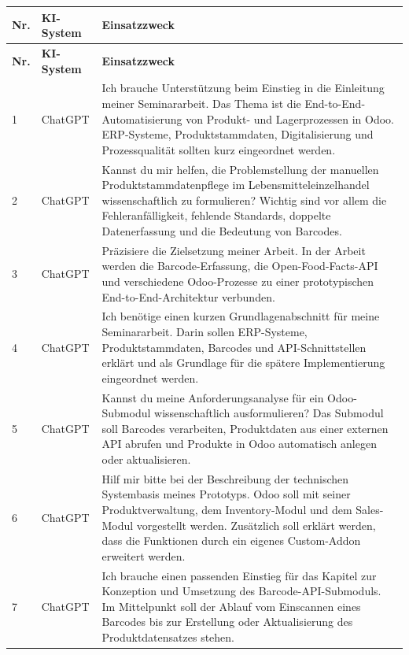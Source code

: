 \documentclass[12pt,a4paper]{article}
\begin{document}
\begin{longtable}{
    @{}
    p{0.9cm}
    p{3.2cm}
    >{\RaggedRight\arraybackslash}
    p{\dimexpr\textwidth-5.0cm\relax}
    @{}
}
\toprule
\textbf{Nr.} & \textbf{KI-System} & \textbf{Einsatzzweck} \\
\midrule
\endfirsthead

\toprule
\textbf{Nr.} & \textbf{KI-System} & \textbf{Einsatzzweck} \\
\midrule
\endhead

1 & ChatGPT & Ich brauche Unterstützung beim Einstieg in die Einleitung meiner Seminararbeit. Das Thema ist die End-to-End-Automatisierung von Produkt- und Lagerprozessen in Odoo. ERP-Systeme, Produktstammdaten, Digitalisierung und Prozessqualität sollten kurz eingeordnet werden. \\

2 & ChatGPT & Kannst du mir helfen, die Problemstellung der manuellen Produktstammdatenpflege im Lebensmitteleinzelhandel wissenschaftlich zu formulieren? Wichtig sind vor allem die Fehleranfälligkeit, fehlende Standards, doppelte Datenerfassung und die Bedeutung von Barcodes. \\

3 & ChatGPT & Präzisiere die Zielsetzung meiner Arbeit. In der Arbeit werden die Barcode-Erfassung, die Open-Food-Facts-API und verschiedene Odoo-Prozesse zu einer prototypischen End-to-End-Architektur verbunden. \\

4 & ChatGPT & Ich benötige einen kurzen Grundlagenabschnitt für meine Seminararbeit. Darin sollen ERP-Systeme, Produktstammdaten, Barcodes und API-Schnittstellen erklärt und als Grundlage für die spätere Implementierung eingeordnet werden. \\

5 & ChatGPT & Kannst du meine Anforderungsanalyse für ein Odoo-Submodul wissenschaftlich ausformulieren? Das Submodul soll Barcodes verarbeiten, Produktdaten aus einer externen API abrufen und Produkte in Odoo automatisch anlegen oder aktualisieren. \\

6 & ChatGPT & Hilf mir bitte bei der Beschreibung der technischen Systembasis meines Prototyps. Odoo soll mit seiner Produktverwaltung, dem Inventory-Modul und dem Sales-Modul vorgestellt werden. Zusätzlich soll erklärt werden, dass die Funktionen durch ein eigenes Custom-Addon erweitert werden. \\

7 & ChatGPT & Ich brauche einen passenden Einstieg für das Kapitel zur Konzeption und Umsetzung des Barcode-API-Submoduls. Im Mittelpunkt soll der Ablauf vom Einscannen eines Barcodes bis zur Erstellung oder Aktualisierung des Produktdatensatzes stehen. \\


\end{longtable}
\end{document}
